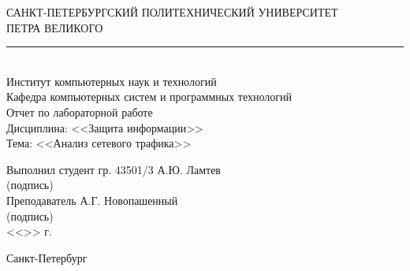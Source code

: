 \begin{titlepage}
\begin{center}
	САНКТ-ПЕТЕРБУРГСКИЙ ПОЛИТЕХНИЧЕСКИЙ УНИВЕРСИТЕТ\\ ПЕТРА ВЕЛИКОГО\\[0.3cm]
	\par\noindent\rule{10cm}{0.4pt}\\[0.3cm]
	Институт компьютерных наук и технологий \\[0.3cm]
	Кафедра компьютерных систем и программных технологий\\[4cm]
	
	Отчет по лабораторной работе\\[3mm]
	Дисциплина: <<Защита информации>>\\[3mm]
	Тема: <<Анализ сетевого трафика>>\\[7cm]
\end{center}

\begin{flushleft}
	\hspace*{5mm} Выполнил студент гр. 43501/3  \hspace*{1.5cm}\sign[3cm]\hfill А.Ю. Ламтев\\
	\hspace*{9.4cm} (подпись)\\[3mm]
	\hspace*{5mm} Преподаватель \hspace*{5.0cm}\sign[3cm]\hfill А.Г. Новопашенный\\
	\hspace*{9.4cm} (подпись)\\[5mm]
	\hspace*{11.1cm} <<\sign[7mm]>> \sign[27mm] \the\year\hspace{1mm} г.
\end{flushleft}

\vfill

\begin{center}
	Санкт-Петербург\\
	\the\year
\end{center}
\end{titlepage}
\addtocounter{page}{1}